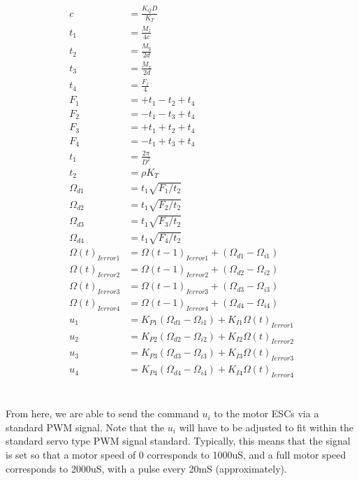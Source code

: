 \documentclass{article}
\numberwithin{equation}{section} %
\begin{document}
{\allowdisplaybreaks \begin{align} 
c &= \frac{K_Q D}{K_T} \\
t_1 &= \frac{M_z}{4c} \\
t_2 &= \frac{M_y}{2d} \\
t_3 &= \frac{M_x}{2d} \\
t_4 &= \frac{F_z}{4} \\
F_1 &= +t_1 - t_2 + t_4 \\
F_2 &= -t_1 - t_3 + t_4 \\
F_3 &= +t_1 + t_2 + t_4 \\
F_4 &= -t_1 + t_3 + t_4 \\
t_1 &= \frac{2 \pi}{D^2} \\
t_2 &= \rho K_T \\
\Omega_{d1}	&=  t_1 \sqrt{F_1 / t_2} \\%
\Omega_{d2}	&=  t_1 \sqrt{F_2 / t_2} \\%
\Omega_{d3}	&=  t_1 \sqrt{F_3 / t_2} \\%
\Omega_{d4}	&=  t_1 \sqrt{F_4 / t_2} \\%
\Omega \left(t \right)_{ Ierror1} &= \Omega \left(t-1 \right)_{ Ierror1} + \left( \Omega_{d1} - \Omega_{i1} \right) \\
\Omega \left(t \right)_{ Ierror2} &= \Omega \left(t-1 \right)_{ Ierror2} + \left( \Omega_{d2} - \Omega_{i2} \right) \\
\Omega \left(t \right)_{ Ierror3} &= \Omega \left(t-1 \right)_{ Ierror3} + \left( \Omega_{d3} - \Omega_{i3} \right) \\
\Omega \left(t \right)_{ Ierror4} &= \Omega \left(t-1 \right)_{ Ierror4} + \left( \Omega_{d4} - \Omega_{i4} \right) \\
u_1 &= K_{P1} \left( \Omega_{d1} - \Omega_{i1} \right) + K_{I1} \Omega \left(t \right) _{Ierror1} \\
u_2 &= K_{P2} \left( \Omega_{d2} - \Omega_{i2} \right) + K_{I2} \Omega \left(t \right) _{Ierror2} \\
u_3 &= K_{P3} \left( \Omega_{d3} - \Omega_{i3} \right) + K_{I3} \Omega \left(t \right) _{Ierror3} \\
u_4 &= K_{P4} \left( \Omega_{d4} - \Omega_{i4} \right) + K_{I4} \Omega \left(t \right) _{Ierror4}
\end{align}}
\\ \\
From here, we are able to send the command $u_i$ to the motor ESCs via a standard PWM signal. Note that the $u_i$ will have to be adjusted to fit within the standard servo type PWM signal standard. Typically, this means that the signal is set so that a motor speed of 0 corresponds to 1000uS, and a full motor speed corresponds to 2000uS, with a pulse every 20mS (approximately).
\end{document}
